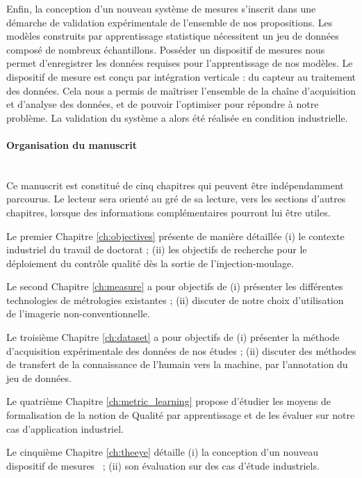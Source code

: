 Enfin, la conception d'un nouveau système de mesures s'inscrit dans une démarche de validation expérimentale de l'ensemble de nos propositions.
Les modèles construits par apprentissage statistique nécessitent un jeu de données composé de nombreux échantillons.
Posséder un dispositif de mesures nous permet d'enregistrer les données requises pour l'apprentissage de nos modèles.
Le dispositif de mesure est conçu par intégration verticale : du capteur au traitement des données.
Cela nous a permis de maîtriser l'ensemble de la chaîne d'acquisition et d'analyse des données, et de pouvoir l'optimiser pour répondre à notre problème.
La validation du système a alors été réalisée en condition industrielle.

\bigskip
\paragraph{Organisation du manuscrit}\mbox{} \\
Ce manuscrit est constitué de cinq chapitres qui peuvent être indépendamment parcourus.
Le lecteur sera orienté au gré de sa lecture, vers les sections d'autres chapitres, lorsque des informations complémentaires pourront lui être utiles.

Le premier Chapitre \ref{ch:objectives} présente de manière détaillée (i) le contexte industriel du travail de doctorat ; (ii) les objectifs de recherche pour le déploiement du contrôle qualité dès la sortie de l'injection-moulage.

Le second Chapitre \ref{ch:measure} a pour objectifs de (i) présenter les différentes technologies de métrologies existantes ; (ii) discuter de notre choix d'utilisation de l'imagerie non-conventionnelle.

Le troisième Chapitre \ref{ch:dataset} a pour objectifs de (i) présenter la méthode d'acquisition expérimentale des données de nos études ; (ii) discuter des méthodes de transfert de la connaissance de l'humain vers la machine, par l'annotation du jeu de données.

Le quatrième Chapitre \ref{ch:metric_learning} propose d'étudier les moyens de formalisation de la notion de Qualité par apprentissage et de les évaluer sur notre cas d'application industriel.

Le cinquième Chapitre \ref{ch:theeye} détaille (i) la conception d'un nouveau dispositif de mesures \ ; (ii) son évaluation sur des cas d'étude industriels.

